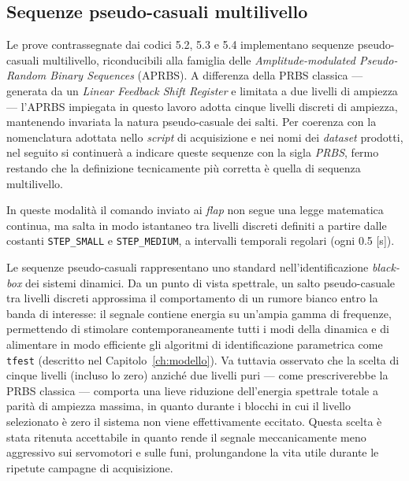 \documentclass[11pt]{report}
\begin{document}
	\subsection{Sequenze pseudo-casuali multilivello}
	\label{subsec:aprbs}
	Le prove contrassegnate dai codici 5.2, 5.3 e 5.4 implementano sequenze pseudo-casuali multilivello, riconducibili alla famiglia delle \textit{Amplitude-modulated Pseudo-Random Binary Sequences} (APRBS). A differenza della PRBS classica --- generata da un \textit{Linear Feedback Shift Register} e limitata a due livelli di ampiezza --- l'APRBS impiegata in questo lavoro adotta cinque livelli discreti di ampiezza, mantenendo invariata la natura pseudo-casuale dei salti. Per coerenza con la nomenclatura adottata nello \textit{script} di acquisizione e nei nomi dei \textit{dataset} prodotti, nel seguito si continuerà a indicare queste sequenze con la sigla \textit{PRBS}, fermo restando che la definizione tecnicamente più corretta è quella di sequenza multilivello.
	
	In queste modalità il comando inviato ai \textit{flap} non segue una legge matematica continua, ma salta in modo istantaneo tra livelli discreti definiti a partire dalle costanti \texttt{STEP\_SMALL} e \texttt{STEP\_MEDIUM}, a intervalli temporali regolari (ogni 0.5 [s]).
	
	Le sequenze pseudo-casuali rappresentano uno standard nell'identificazione \textit{black-box} dei sistemi dinamici. Da un punto di vista spettrale, un salto pseudo-casuale tra livelli discreti approssima il comportamento di un rumore bianco entro la banda di interesse: il segnale contiene energia su un'ampia gamma di frequenze, permettendo di stimolare contemporaneamente tutti i modi della dinamica e di alimentare in modo efficiente gli algoritmi di identificazione parametrica come \texttt{tfest} (descritto nel Capitolo~\ref{ch:modello}). Va tuttavia osservato che la scelta di cinque livelli (incluso lo zero) anziché due livelli puri --- come prescriverebbe la PRBS classica --- comporta una lieve riduzione dell'energia spettrale totale a parità di ampiezza massima, in quanto durante i blocchi in cui il livello selezionato è zero il sistema non viene effettivamente eccitato. Questa scelta è stata ritenuta accettabile in quanto rende il segnale meccanicamente meno aggressivo sui servomotori e sulle funi, prolungandone la vita utile durante le ripetute campagne di acquisizione.
	
\end{document}

